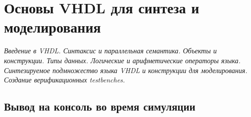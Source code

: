 \chapter{Основы VHDL для синтеза и моделирования}

\emph{Введение в VHDL. Синтаксис и параллельная семантика. Объекты и конструкции. Типы данных. Логические и арифметические операторы языка. Синтезируемое подмножество языка VHDL и конструкции для моделирования. Создание верификационных testbenches.}

\section{Вывод на консоль во время симуляции}
